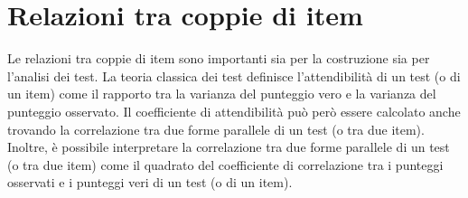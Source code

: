 %
%
%
%
%
%
%


\section{Relazioni tra coppie di item}

Le relazioni tra coppie di item sono importanti sia per la costruzione
sia per l'analisi dei test. La teoria classica dei test definisce 
l'attendibilità di un test (o di un item) come il rapporto tra la
varianza del punteggio vero e la varianza del punteggio osservato.  Il coefficiente di
attendibilità può però essere calcolato anche trovando la
correlazione tra due forme parallele di un test (o tra due item).  
 Inoltre, è possibile interpretare la correlazione tra due forme
parallele di un test (o tra due item) come il quadrato del
coefficiente di correlazione tra i punteggi osservati e i punteggi
veri di un test (o di un item). 

